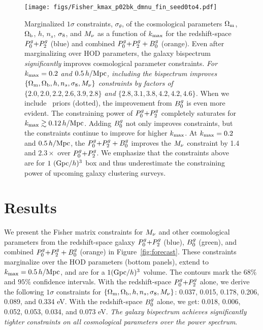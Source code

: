 \begin{figure}
    \begin{center}
        \texttt{[image: figs/Fisher\_kmax\_p02bk\_dmnu\_fin\_seed0to4.pdf]}
        \caption{Marginalized $1\sigma$ constraints, $\sigma_\theta$, of the
        cosmological parameters $\Omega_{\rm m}$, $\Omega_{\rm b}$, $h$, $n_s$, $\sigma_8$, and $M_\nu$
        as a function of $k_{\rm max}$ for the redshift-space $P^g_0{+}P^g_2$ (blue)
        and combined $P^g_0{+}P^g_2 + B^g_0$ (orange). Even after marginalizing over
        HOD parameters, the galaxy bispectrum {\em significantly} improves 
        cosmological parameter constraints. %
        {\em For $k_{\rm max} = 0.2$ and $0.5\,h/\mathrm{Mpc}$, including the bispectrum
        improves $\{\Omega_{\rm m}, \Omega_{\rm b}, h, n_s, \sigma_8, M_\nu\}$ constraints by factors 
        of $\{2.0, 2.0, 2.2, 2.6, 3.9, 2.8\}$ and $\{2.8, 3.1, 3.8, 4.2, 4.2, 4.6\}$.} 
        When we include \planck~priors (dotted), the improvement from $B^g_0$ is even more
        evident. The constraining power of $P^g_0{+}P^g_2$ completely
        saturates for $k_{\rm max} \gtrsim 0.12\,h/\mathrm{Mpc}$. Adding $B^g_0$ not only 
        improves constraints, but the constraints continue to improve for
        higher $k_{\rm max}$. At $k_{\rm max} = 0.2$ and $0.5\,h/\mathrm{Mpc}$, the $P^g_0{+}P^g_2
        + B^g_0$ improves the $M_\nu$ constraint by 1.4 and $2.3\times$ over $P^g_0{+}P^g_2$. 
        We emphasize that the constraints above are for $1~({\rm Gpc}/h)^3$ box
        and thus underestimate the constraining power of upcoming galaxy
        clustering surveys.
        }
        \label{fig:kmax_forecast}
    \end{center}
\end{figure}

\section{Results} \label{sec:results} 
We present the Fisher matrix constraints for $M_\nu$ and other cosmological
parameters from the redshift-space galaxy $P^g_0{+}P^g_2$ (blue), $B^g_0$ (green), and 
combined $P^g_0{+}P^g_2 + B^g_0$ (orange) in Figure~\ref{fig:forecast}. These
constraints marginalize over the \cite{zheng2007} HOD parameters %
(bottom panels), extend to $k_{\rm max} = 0.5\,h/\mathrm{Mpc}$, and are for a $1 ({\rm
Gpc}/h)^3$ volume. The contours mark the $68\%$ and $95\%$ confidence
intervals. With the redshift-space $P^g_0{+}P^g_2$
alone, we derive the following $1\sigma$ constraints for $\{\Omega_{\rm m}, \Omega_{\rm b}, h, n_s,
\sigma_8, M_\nu\}$: 
0.037, 0.015, 0.178, 0.206, 0.089, and 0.334 eV.
With the redshift-space $B^g_0$ alone, we get: 
0.018, 0.006, 0.052, 0.053, 0.034, and 0.073 eV.
{\em The galaxy bispectrum achieves significantly tighter constraints on all
cosmological parameters over the power spectrum}. 

